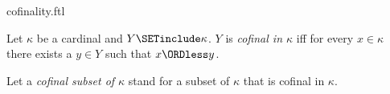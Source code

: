 \documentclass{naproche-library}
\begin{document}
\begin{smodule}[title=Cofinality]{cofinality.ftl}


\begin{definition}[forthel,id=SET_THEORY_06_5621203645212879]
  Let $\kappa$ be a cardinal and $Y \SETinclude \kappa$.
  $Y$ is \emph{cofinal in $\kappa$} iff for every $x \in \kappa$ there exists a $y \in Y$ such that $x \ORDless y$.

  Let a \emph{cofinal subset of $\kappa$} stand for a subset of $\kappa$ that is cofinal in $\kappa$.
\end{definition}
\end{smodule}
\end{document}
